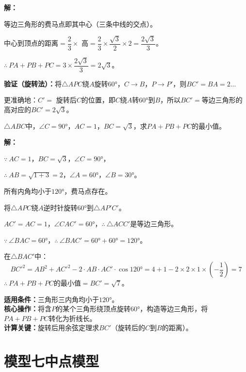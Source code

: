 \documentclass[12pt, a4paper]{ctexart}
\begin{document}
\textbf{解：}

等边三角形的费马点即其中心（三条中线的交点）。

中心到顶点的距离$= \dfrac{2}{3} \times$ 高$= \dfrac{2}{3} \times \dfrac{\sqrt{3}}{2} \times 2 = \dfrac{2\sqrt{3}}{3}$。

$\therefore\ PA + PB + PC = 3 \times \dfrac{2\sqrt{3}}{3} = \boxed{2\sqrt{3}}$。

\textbf{验证（旋转法）：}将$\triangle APC$绕$A$旋转$60°$，$C \to B$，$P \to P'$，则$BC' = BA = 2$...

更准确地：$C' = $ 旋转后$C$的位置，即$C$绕$A$转$60°$到$B$，所以$BC' = $等边三角形的高对应的$BC' = 2\sqrt{3}$。

\begin{examplebox}[【例题12】直角三角形中的费马点]
$\triangle ABC$中，$\angle C = 90°$，$AC = 1$，$BC = \sqrt{3}$，求$PA + PB + PC$的最小值。
\end{examplebox}

\textbf{解：}

$\because\ AC = 1$，$BC = \sqrt{3}$，$\angle C = 90°$，

$\therefore\ AB = \sqrt{1 + 3} = 2$，$\angle A = 60°$，$\angle B = 30°$。

所有内角均小于$120°$，费马点存在。

将$\triangle APC$绕$A$逆时针旋转$60°$到$\triangle AP'C'$。

$AC' = AC = 1$，$\angle CAC' = 60°$，$\therefore\ \triangle ACC'$是等边三角形。

$\because\ \angle BAC = 60°$，$\therefore\ \angle BAC' = 60° + 60° = 120°$。

在$\triangle BAC'$中：
\[
BC'^2 = AB^2 + AC'^2 - 2 \cdot AB \cdot AC' \cdot \cos 120° = 4 + 1 - 2 \times 2 \times 1 \times \left(-\frac{1}{2}\right) = 7
\]
$\therefore\ PA + PB + PC$的最小值$= BC' = \boxed{\sqrt{7}}$。

\begin{tipbox}
\textbf{适用条件：}三角形三内角均小于$120°$。\\
\textbf{核心操作：}将含$P$的某个三角形绕顶点旋转$60°$，构造等边三角形，将$PA+PB+PC$转化为折线长。\\
\textbf{计算关键：}旋转后用余弦定理求$BC'$（旋转后的$C$到$B$的距离）。
\end{tipbox}

\newpage
\section*{\textcolor{modelteal}{模型七\quad 中点模型}}
\end{document}
